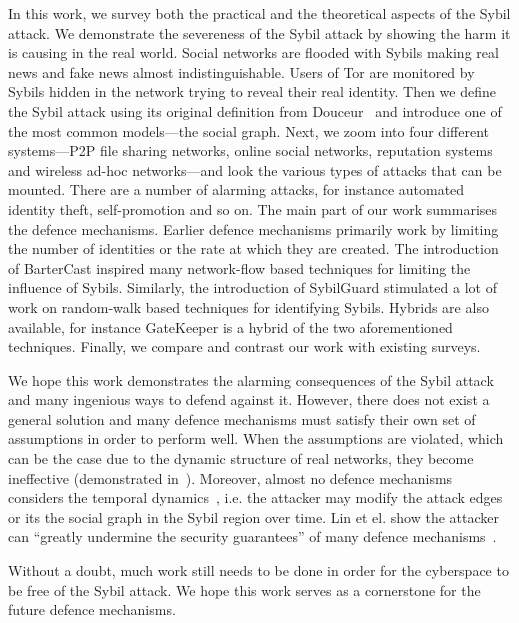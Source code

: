 In this work, we survey both the practical and the theoretical aspects of the
Sybil attack. We demonstrate the severeness of the Sybil attack by showing the
harm it is causing in the real world. Social networks are flooded with Sybils
making real news and fake news almost indistinguishable. Users of Tor are
monitored by Sybils hidden in the network trying to reveal their real identity.
Then we define the Sybil attack using its original definition from
Douceur~\cite{douceur2002sybil} and introduce one of the most common
models---the social graph. Next, we zoom into four different systems---P2P file
sharing networks, online social networks, reputation systems and wireless ad-hoc
networks---and look the various types of attacks that can be mounted. There are
a number of alarming attacks, for instance automated identity theft,
self-promotion and so on. The main part of our work summarises the defence
mechanisms. Earlier defence mechanisms primarily work by limiting the number of
identities or the rate at which they are created. The introduction of BarterCast
inspired many network-flow based techniques for limiting the influence of
Sybils. Similarly, the introduction of SybilGuard stimulated a lot of work on
random-walk based techniques for identifying Sybils. Hybrids are also available,
for instance GateKeeper is a hybrid of the two aforementioned techniques.
Finally, we compare and contrast our work with existing surveys.

We hope this work demonstrates the alarming consequences of the Sybil attack and
many ingenious ways to defend against it. However, there does not exist a
general solution and many defence mechanisms must satisfy their own set of
assumptions in order to perform well. When the assumptions are violated, which
can be the case due to the dynamic structure of real networks, they become
ineffective (demonstrated in~\cite{liu2016smartwalk}). Moreover, almost no
defence mechanisms considers the temporal dynamics~\cite{liu2015exploiting},
i.e. the attacker may modify the attack edges or its the social graph in the
Sybil region over time. Lin et el. show the attacker can ``greatly undermine the
security guarantees'' of many defence mechanisms~\cite{liu2015exploiting}.

Without a doubt, much work still needs to be done in order for the cyberspace to
be free of the Sybil attack. We hope this work serves as a cornerstone for the
future defence mechanisms.

